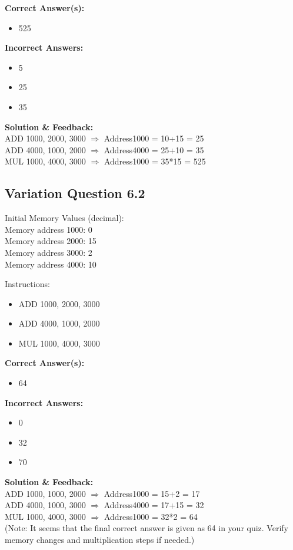 \textbf{Correct Answer(s):}
\begin{itemize}
    \item 525
\end{itemize}

\textbf{Incorrect Answers:}
\begin{itemize}
    \item 5
    \item 25
    \item 35
\end{itemize}

\textbf{Solution \& Feedback:}\\
ADD 1000, 2000, 3000 $\Rightarrow$ Address1000 = 10+15 = 25\\
ADD 4000, 1000, 2000 $\Rightarrow$ Address4000 = 25+10 = 35\\
MUL 1000, 4000, 3000 $\Rightarrow$ Address1000 = 35*15 = 525

\subsection{Variation Question 6.2}

Initial Memory Values (decimal):\\
Memory address 1000: 0\\
Memory address 2000: 15\\
Memory address 3000: 2\\
Memory address 4000: 10

Instructions:
\begin{itemize}
    \item ADD 1000, 2000, 3000
    \item ADD 4000, 1000, 2000
    \item MUL 1000, 4000, 3000
\end{itemize}

\textbf{Correct Answer(s):}
\begin{itemize}
    \item 64
\end{itemize}

\textbf{Incorrect Answers:}
\begin{itemize}
    \item 0
    \item 32 
    \item 70 
\end{itemize}

\textbf{Solution \& Feedback:}\\
ADD 1000, 1000, 2000 $\Rightarrow$ Address1000 = 15+2 = 17\\
ADD 4000, 1000, 3000 $\Rightarrow$ Address4000 = 17+15 = 32\\
MUL 1000, 4000, 3000 $\Rightarrow$ Address1000 = 32*2 = 64\\
(Note: It seems that the final correct answer is given as 64 in your quiz. Verify memory changes and multiplication steps if needed.)

